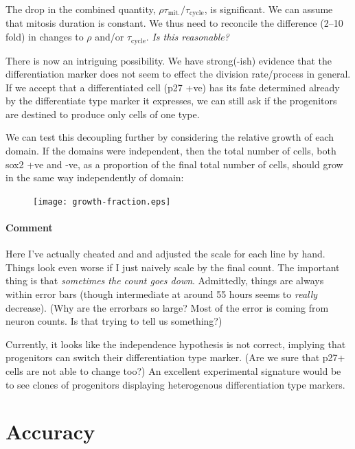 \documentclass[10pt,english]{article}
\begin{document}
The drop in the combined quantity, $\rho \tau_\textrm{mit.} / \tau_\textrm{cycle}$,
is significant. We can assume that mitosis duration is constant. We thus need
to reconcile the difference (2--10 fold) in changes to $\rho$ and/or
$\tau_\textrm{cycle}$. \emph{Is this reasonable?}

There is now an intriguing possibility. We have strong(-ish) evidence that the
differentiation marker does not seem to effect the division rate/process in
general. If we accept that a differentiated cell (p27 +ve) has its fate 
determined already by the differentiate type marker it expresses, we can still ask
if the progenitors are destined to produce only cells of one type.

We can test this decoupling further by considering the relative growth of each 
domain. If the domains were independent, then the total number of cells, both 
sox2 +ve and -ve, as a proportion of the final total number of cells, should 
grow in the same way independently of domain:

\begin{figure}[h]
	\begin{center}
		\texttt{[image: growth-fraction.eps]}
	\end{center}
\end{figure}

\paragraph{Comment}

Here I've actually cheated and and adjusted the scale for each line by hand.
Things look even worse if I just naively scale by the final count. The important
thing is that \emph{sometimes the count goes down}. Admittedly, things are
always within error bars (though intermediate at around 55 hours seems to 
\emph{really} decrease). (Why are the errorbars so large? Most of the error is
coming from neuron counts. Is that trying to tell us something?)

Currently, it looks like the independence hypothesis is not correct, implying
that progenitors can switch their differentiation type marker. (Are we sure
that p27+ cells are not able to change too?) An excellent experimental signature
would be to see clones of progenitors displaying heterogenous differentiation
type markers.

\section{Accuracy}
\end{document}
